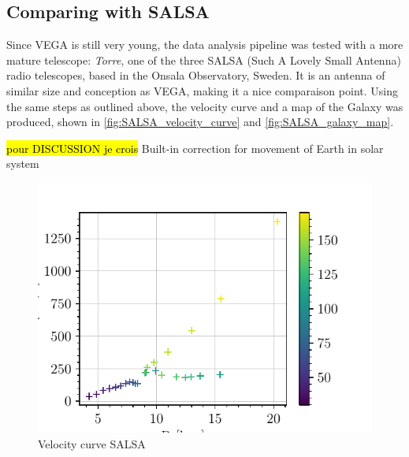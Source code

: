 \subsection{Comparing with SALSA}
Since VEGA is still very young, the data analysis pipeline was tested with a more mature telescope: \emph{Torre}, one of the three SALSA (Such A Lovely Small Antenna) radio telescopes, based in the Onsala Observatory, Sweden.
It is an antenna of similar size and conception as VEGA, making it a nice comparaison point. Using the same steps as outlined above, the velocity curve and a map of the Galaxy was produced, shown in \autoref{fig:SALSA_velocity_curve} and \autoref{fig:SALSA_galaxy_map}.

\hl{pour DISCUSSION je crois} Built-in correction for movement of Earth in solar system

\begin{figure}[htbp]
    \begin{minipage}[t]{0.5\textwidth}
        \centering
        \captionsetup{width=.9\textwidth}
        \includegraphics[scale=1]{figures/SALSA_velocity_curve.pdf}
        \caption{Velocity curve SALSA}
        \label{fig:SALSA_velocity_curve}
    \end{minipage}
    \begin{minipage}[t]{0.5\textwidth}
        \centering
        \captionsetup{width=.9\textwidth}

\end{minipage}
\end{figure}
